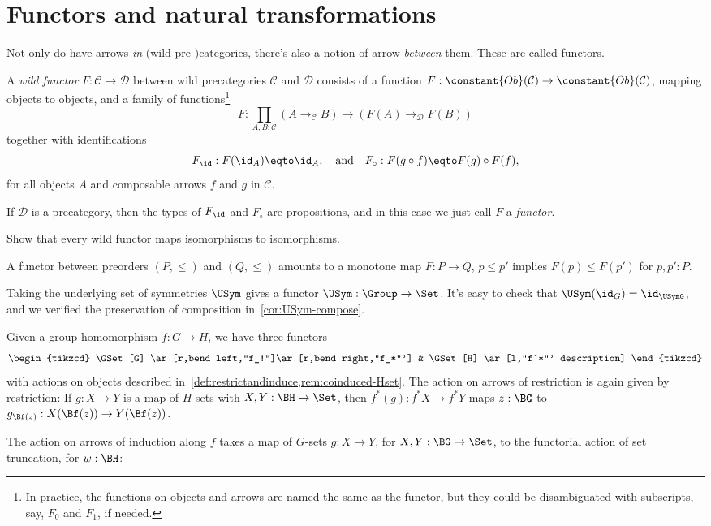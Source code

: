 \section{Functors and natural transformations}
\label{sec:naturality}

Not only do have arrows \emph{in} (wild pre-)categories, there's also
a notion of arrow \emph{between} them. These are called functors.
\begin{definition}\label{def:functor}
  A \emph{wild functor}
  $F : \mathcal C \to \mathcal D$
  between wild precategories $\mathcal C$ and $\mathcal D$
  consists of a function
  $F : \constant{Ob}(\mathcal C) \to \constant{Ob}(\mathcal C)$,
  mapping objects to objects,
  and a family of functions\footnote{%
    In practice, the functions on objects and arrows are named the same as
    the functor, but they could be disambiguated with subscripts,
    say, $F_0$ and $F_1$, if needed.}
  \[
    F : \prod_{A,B:\mathcal C}(A \to_{\mathcal C} B) \to (F(A) \to_{\mathcal D} F(B))
  \]
  together with identifications
  \[
    F_{\id} : F(\id_A) \eqto \id_A,\quad\text{and}\quad
    F_{\circ} : F(g\circ f) \eqto F(g)\circ F(f),
  \]
  for all objects $A$ and composable arrows $f$ and $g$ in $\mathcal C$.

  If $\mathcal D$ is a precategory, then the types of $F_{\id}$ and $F_{\circ}$
  are propositions, and in this case we just call $F$ a \emph{functor}.
\end{definition}
\begin{xca}
  Show that every wild functor maps isomorphisms to isomorphisms.
\end{xca}
\begin{example}
  A functor between preorders $(P,\le)$ and $(Q,\le)$ amounts to a monotone map
  $F : P\to Q$, \ie $p\le p'$ implies $F(p) \le F(p')$ for $p,p':P$.
\end{example}
\begin{example}
  Taking the underlying set of symmetries $\USym$
  gives a functor $\USym : \Group \to \Set$.
  It's easy to check that $\USym(\id_G) = \id_{\USymG}$,
  and we verified the preservation of composition
  in~\cref{cor:USym-compose}.
\end{example}
\begin{example}
  Given a group homomorphism $f : G \to H$,
  we have three functors
  \[
    \begin{tikzcd}
      \GSet[G] \ar[r,bend left,"f_!"]\ar[r,bend right,"f_*"'] &
      \GSet[H] \ar[l,"f^*"' description]
    \end{tikzcd}
  \]
  with actions on objects described in~\cref{def:restrictandinduce,rem:coinduced-Hset}.
  The action on arrows of restriction is again given by restriction:
  If $g : X \to Y$ is a map of $H$-sets with $X,Y:\BH \to \Set$,
  then $f^*(g) : f^*X \to f^*Y$ maps $z:\BG$ to $g_{\Bf(z)} : X(\Bf(z)) \to Y(\Bf(z))$.

  The action on arrows of induction along $f$ takes a map of $G$-sets $g : X \to Y$,
  for $X,Y : \BG\to\Set$,
  to the functorial action of set truncation, for $w:\BH$:
\end{example}
